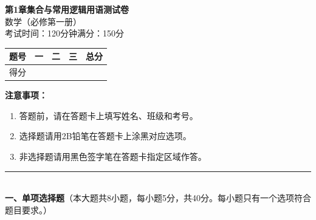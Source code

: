 \documentclass[12pt, a4paper]{ctexart}
\begin{document}
\begin{center}
{\Large\bfseries 第1章\quad 集合与常用逻辑用语\quad 测试卷}\\[6pt]
{\normalsize 数学（必修第一册）}\\[4pt]
{\small 考试时间：120分钟\quad 满分：150分}
\end{center}

\vspace{2pt}
\begin{center}
\begin{tabular}{|c|c|c|c|c|}
\hline
题号 & 一 & 二 & 三 & 总分 \\ \hline
得分 & & & & \\ \hline
\end{tabular}
\end{center}
\vspace{4pt}

\noindent\textbf{注意事项：}
\begin{enumerate}[leftmargin=2em]
  \item 答题前，请在答题卡上填写姓名、班级和考号。
  \item 选择题请用2B铅笔在答题卡上涂黑对应选项。
  \item 非选择题请用黑色签字笔在答题卡指定区域作答。
\end{enumerate}

\vspace{6pt}

\noindent\rule{\textwidth}{0.4pt}\\[2pt]
{\large\bfseries 一、单项选择题}（本大题共8小题，每小题5分，共40分。每小题只有一个选项符合题目要求。）

\vspace{6pt}
\end{document}

